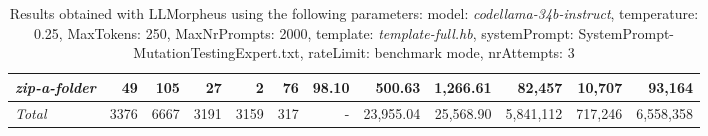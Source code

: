 \begin{table*}
{\begin{tabular}{l||r|r|r|r|r|r||r|r||r|r|r}
   \hline
   \textit{zip-a-folder} & 49 & 105 & 27 & 2 & 76 & 98.10 & 500.63 & 1,266.61 & 82,457 & 10,707 & 93,164 \\ 
   \hline
   \textit{Total} & 3376 & 6667 & 3191 & 3159 & 317 & - & 23,955.04  & 25,568.90 & 5,841,112 & 717,246 & 6,558,358 \\ 
 \end{tabular}
 }
 \caption{Results obtained with LLMorpheus using the following parameters: 
   model: \textit{codellama-34b-instruct}, 
   temperature: 0.25, 
   MaxTokens: 250, 
   MaxNrPrompts: 2000, 
   template: \textit{template-full.hb}, 
   systemPrompt: SystemPrompt-MutationTestingExpert.txt, 
   rateLimit: benchmark mode, 
   nrAttempts: 3  
 }
\end{table*}

